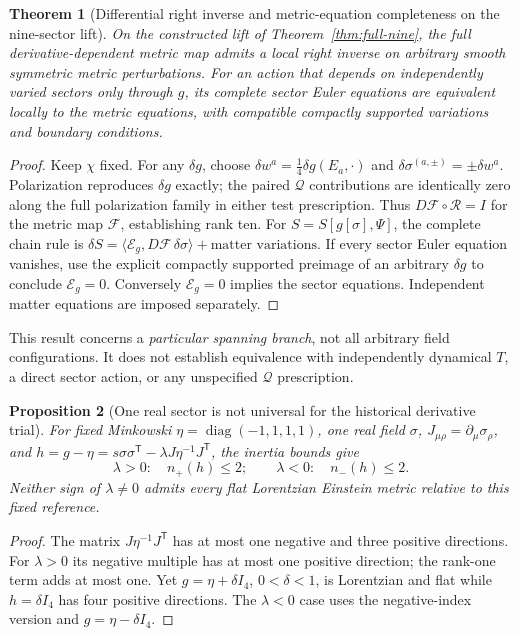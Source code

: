 \documentclass[11pt,a4paper]{article}
\newtheorem{theorem}{Theorem}[section]
\newtheorem{proposition}[theorem]{Proposition}
\begin{document}
\begin{theorem}[Differential right inverse and metric-equation completeness on the nine-sector lift]\label{thm:full-rank-nine}
On the constructed lift of Theorem~\ref{thm:full-nine}, the full derivative-dependent metric map admits a local right inverse on arbitrary smooth symmetric metric perturbations. For an action that depends on independently varied sectors only through \(g\), its complete sector Euler equations are equivalent locally to the metric equations, with compatible compactly supported variations and boundary conditions.
\end{theorem}
\begin{proof}
Keep \(\chi\) fixed. For any \(\delta g\), choose \(\delta w^a=\tfrac14\delta g(E_a,\cdot)\) and \(\delta\sigma^{(a,\pm)}=\pm\delta w^a\). Polarization reproduces \(\delta g\) exactly; the paired \(\mathcal Q\) contributions are identically zero along the full polarization family in either test prescription. Thus \(D\mathcal F\circ\mathcal R=I\) for the metric map \(\mathcal F\), establishing rank ten. For \(S=S[g[\sigma],\Psi]\), the complete chain rule is \(\delta S=\langle\mathcal E_g,D\mathcal F\,\delta\sigma\rangle+\text{matter variations}\). If every sector Euler equation vanishes, use the explicit compactly supported preimage of an arbitrary \(\delta g\) to conclude \(\mathcal E_g=0\). Conversely \(\mathcal E_g=0\) implies the sector equations. Independent matter equations are imposed separately.\end{proof}
\noindent This result concerns a \emph{particular spanning branch}, not all arbitrary field configurations. It does not establish equivalence with independently dynamical \(T\), a direct sector action, or any unspecified \(\mathcal Q\) prescription.

\begin{proposition}[One real sector is not universal for the historical derivative trial]\label{prop:one-sector-inertia}
For fixed Minkowski \(\eta=\operatorname{diag}(-1,1,1,1)\), one real field \(\sigma\), \(J_{\mu\rho}=\partial_\mu\sigma_\rho\), and \(h=g-\eta=s\sigma\sigma^{\mathsf T}-\lambda J\eta^{-1}J^{\mathsf T}\), the inertia bounds give
\begin{equation}\label{eq:inertia-obstruction}
 \lambda>0:\quad n_+(h)\le2;\qquad \lambda<0:\quad n_-(h)\le2.
\end{equation}
Neither sign of \(\lambda\ne0\) admits every flat Lorentzian Einstein metric relative to this fixed reference.
\end{proposition}
\begin{proof}
The matrix \(J\eta^{-1}J^{\mathsf T}\) has at most one negative and three positive directions. For \(\lambda>0\) its negative multiple has at most one positive direction; the rank-one term adds at most one. Yet \(g=\eta+\delta I_4\), \(0<\delta<1\), is Lorentzian and flat while \(h=\delta I_4\) has four positive directions. The \(\lambda<0\) case uses the negative-index version and \(g=\eta-\delta I_4\).\end{proof}
\end{document}
